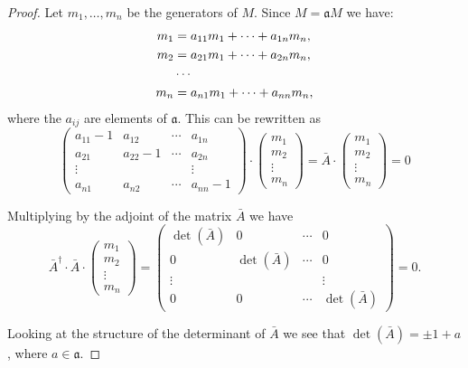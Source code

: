 \begin{proof}
  Let $m_1, \ldots, m_n$ be the generators of $M$.  Since
  $M = \mathfrak{a}M$ we have:
  \[
\begin{aligned}
m_1 & = a_{11} m_1 + \dots + a_{1n}m_n, \\
m_2 & = a_{21} m_1 + \dots + a_{2n}m_n, \\
\null    & \cdots \\
m_n & = a_{n1} m_1 + \dots + a_{nn}m_n,
\end{aligned}
\]
where the $a_{ij}$ are elements of $\mathfrak{a}$.
This can be rewritten as
\[
\begin{pmatrix}
a_{11} - 1 & a_{12} & \cdots & a_{1n} \\
a_{21}     & a_{22} - 1 & \cdots & a_{2n} \\
\vdots  &  &         & \vdots \\
a_{n1} & a_{n2} & \cdots & a_{nn} - 1 
\end{pmatrix}
\cdot
\begin{pmatrix} m_1 \\ m_2 \\ \vdots \\ m_n \end{pmatrix}
=
\bar{A}
\cdot
\begin{pmatrix} m_1 \\ m_2 \\ \vdots \\ m_n \end{pmatrix}
= 0
\]

Multiplying by the adjoint of the matrix $\bar{A}$ we have
\[
\bar{A}^{\dagger} \cdot \bar{A} \cdot 
\begin{pmatrix} m_1 \\ m_2 \\ \vdots \\ m_n \end{pmatrix} =
\begin{pmatrix}
\det(\bar{A}) & 0 & \cdots & 0 \\
0 & \det(\bar{A}) & \cdots & 0 \\
\vdots & & & \vdots \\
0 & 0 & \cdots & \det(\bar{A}) 
\end{pmatrix} = 0.
\]

Looking at the structure of the determinant of $\bar{A}$ we see that
$\det(\bar{A}) = \pm 1 + a$, where $a \in \mathfrak{a}$.
\end{proof}


